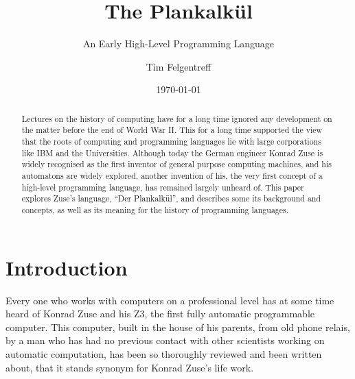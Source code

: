 \documentclass{llncs}
\begin{document}
%
%
\pagestyle{headings}  %
%
\mainmatter %
%
\title{The Plankalkül}
\subtitle{An Early High-Level Programming Language}
%
%
\author{Tim Felgentreff}
\date{\today}
%
%
%

\maketitle
\begin{abstract}
   Lectures on the history of computing have for a long time 
   ignored any development on the matter before the end of World War II. 
   This for a long time supported the view that the roots of 
   computing and programming languages lie with large corporations 
   like IBM and the Universities.
   Although today
   the German engineer Konrad Zuse is widely recognised
   as the first inventor of general purpose computing machines, 
   and his automatons are widely explored, another invention of 
   his, the very first concept of a 
   high-level programming language, has remained largely unheard of.
   This paper explores Zuse's language, ``Der Plankalkül'', 
   and describes some its background and concepts, as well as its 
   meaning for the history of programming languages.
\end{abstract}
 \section{Introduction}
   Every one who works with computers on a professional level has 
   at some time heard of Konrad Zuse and his Z3, the first fully 
   automatic programmable computer. This computer, built in the 
   house of his parents, from old phone relais, by a man who has had no 
   previous contact with other scientists working on automatic computation, 
   has been so thoroughly reviewed and been written about, that it 
   stands synonym for Konrad Zuse's life work.
\end{document}
